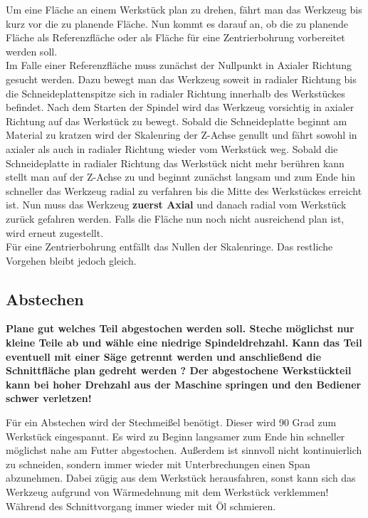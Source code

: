 \documentclass{\basedir/fablab-document}
\begin{document}
Um eine Fläche an einem Werkstück plan zu drehen, fährt man das Werkzeug bis kurz vor die zu planende Fläche. Nun kommt es darauf an, ob die zu planende Fläche als Referenzfläche oder als Fläche für eine Zentrierbohrung vorbereitet werden soll. \\

Im Falle einer Referenzfläche muss zunächst der Nullpunkt in Axialer Richtung gesucht werden. Dazu bewegt man das Werkzeug soweit in radialer Richtung bis die Schneideplattenspitze sich in radialer Richtung innerhalb des Werkstückes befindet. Nach dem Starten der Spindel wird das Werkzeug vorsichtig in axialer Richtung auf das Werkstück zu bewegt. Sobald die Schneideplatte beginnt am Material zu kratzen wird der Skalenring der Z-Achse genullt und fährt sowohl in axialer als auch in radialer Richtung wieder vom Werkstück weg. Sobald die Schneideplatte in radialer Richtung das Werkstück nicht mehr berühren kann stellt man auf der Z-Achse zu und beginnt zunächst langsam und zum Ende hin schneller das Werkzeug radial zu verfahren bis die Mitte des Werkstückes erreicht ist. Nun muss das Werkzeug \textbf{zuerst Axial} und danach radial vom Werkstück zurück gefahren werden. Falls die Fläche nun noch nicht ausreichend plan ist, wird erneut zugestellt. \\
Für eine Zentrierbohrung entfällt das Nullen der Skalenringe. Das restliche Vorgehen bleibt jedoch gleich.

\subsection{Abstechen}

\textbf{Plane gut welches Teil abgestochen werden soll. Steche möglichst nur kleine Teile ab und wähle eine niedrige Spindeldrehzahl. Kann das Teil eventuell mit einer Säge getrennt werden und anschließend die Schnittfläche plan gedreht werden ? Der abgestochene Werkstückteil kann bei hoher Drehzahl aus der Maschine springen und den Bediener schwer verletzen!}

Für ein Abstechen wird der Stechmeißel benötigt. Dieser wird 90 Grad zum Werkstück eingespannt. Es wird zu Beginn langsamer zum Ende hin schneller möglichst nahe am Futter abgestochen. Außerdem ist sinnvoll nicht kontinuierlich zu schneiden, sondern immer wieder mit Unterbrechungen einen Span abzunehmen. Dabei zügig aus dem Werkstück herausfahren, sonst kann sich das Werkzeug aufgrund von Wärmedehnung mit dem Werkstück verklemmen! Während des Schnittvorgang immer wieder mit Öl schmieren.\\
\end{document}

